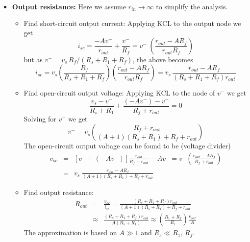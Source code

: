 \documentclass{article}
\begin{document}
\begin{itemize}
\begin{itemize}
    \item {\bf Output resistance:} Here we assume $r_{in}\rightarrow \infty$
      to simplify the analysis. 
      \begin{itemize}
      \item Find short-circuit output current: Applying KCL to the 
        output node we get
        \begin{equation}
          i_{sc}=\frac{-A v^-}{r_{out}}+\frac{v^-}{R_f}
          =v^-\;\left(\frac{r_{out}-AR_f}{r_{out}R_f} \right)
        \end{equation}
        but as $v^-=v_s \,R_f/(R_s+R_1+R_f)$, the above becomes
        \begin{equation}
          i_{sc}=v_s\left(\frac{R_f}{R_s+R_1+R_f}\right)
          \left(\frac{r_{out}-AR_f}{r_{out}R_f} \right)
          =v_s\,\frac{r_{out}-AR_f}{(R_s+R_1+R_f)r_{out}}  
        \end{equation}
      \item Find open-circuit output voltage: Applying KCL to the node 
        of $v^-$ we get
        \begin{equation}
          \frac{v_s-v^-}{R_s+R_1}+\frac{(-Av^-)-v^-}{R_f+r_{out}}=0 
        \end{equation}
        Solving for $v^-$ we get
        \begin{equation}
          v^-=v_s \left(\frac{R_f+r_{out}}{(A+1)(R_s+R_1)+R_f+r_{out}} \right)
        \end{equation}
        The open-circuit output voltage can be found to be (voltage divider)
        \begin{eqnarray}
          v_{oc}&=&[v^--(-Av^-)]\frac{r_{out}}{R_f+r_{out}}-Av^-
          =v^- \left(\frac{r_{out}-AR_f}{R_f+r_{out}}\right)
          \nonumber\\
          &=&v_s \;\frac{r_{out}-AR_f}{(A+1)(R_s+R_1)+R_f+r_{out}} 
        \end{eqnarray}
      \item Find output resistance:
        \begin{eqnarray}
          R_{out}&=&\frac{v_{oc}}{i_{sc}}
          =\frac{(R_s+R_1+R_f)r_{out}}{(A+1)(R_s+R_1)+R_f+r_{out}}
          \nonumber\\
          &\approx& \frac{(R_s+R_1+R_f)r_{out}}{A(R_s+R_1)} 
          \approx \left(\frac{R_1+R_f}{R_1}\right) \frac{r_{out}}{A} 
        \end{eqnarray}
        The approximation is based on $A\gg 1$ and $R_s\ll R_1,\,R_f$.


\end{itemize}
\end{itemize}
\end{itemize}
\end{document}
